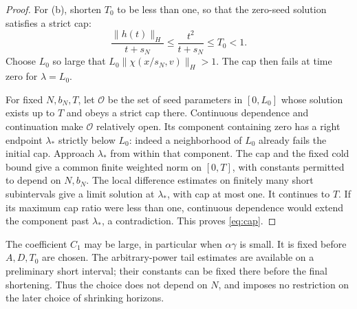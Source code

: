 \begin{proof}
For (b), shorten \(T_0\) to be less than one, so that the zero-seed
solution satisfies a strict cap:
\[
\frac{\|h(t)\|_H}{t+s_N}\le\frac{t^2}{t+s_N}\le T_0<1.
\]
Choose \(L_0\) so large that
\(L_0\|\chi(x/s_N,v)\|_H>1\). The cap then fails at time zero for
\(\lambda=L_0\).

For fixed \(N,b_N,T\), let \(\mathcal O\) be the set of seed parameters
in \([0,L_0]\) whose solution exists up to \(T\) and obeys a strict cap
there. Continuous dependence and continuation make \(\mathcal O\)
relatively open. Its component containing zero has a right endpoint
\(\lambda_*\) strictly below \(L_0\): indeed a neighborhood of \(L_0\)
already fails the initial cap. Approach \(\lambda_*\) from within that
component. The cap and the fixed cold bound give a common finite
weighted norm on \([0,T]\), with constants permitted to depend on
\(N,b_N\). The local difference estimates on finitely many short
subintervals give a limit solution at \(\lambda_*\), with cap at most
one. It continues to \(T\). If its maximum cap ratio were less than
one, continuous dependence would extend the component past
\(\lambda_*\), a contradiction. This proves \eqref{eq:cap}.
\end{proof}

\begin{remark}\label{cap:parameter-order}
The coefficient \(C_1\) may be large, in particular when
\(\alpha\gamma\) is small. It is fixed before \(A,D,T_0\) are chosen.
The arbitrary-power tail estimates are available on a preliminary
short interval; their constants can be fixed there before the final
shortening. Thus the choice does not depend on \(N\), and imposes
no restriction on the later choice of shrinking horizons.
\end{remark}
